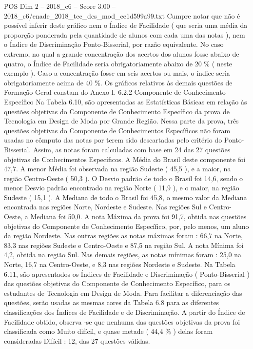 \begin{textsample}{POS Dim 2 – 2018\_c6 – Score 3.00 – 2018\_c6/enade\_2018\_tec\_des\_mod\_ce1d599a99.txt}
Cumpre notar que não é possível inferir deste gráfico nem o Índice de Facilidade ( que seria uma média da proporção ponderada pela quantidade de alunos com cada uma das notas ), nem o Índice de Discriminação Ponto-Bisserial, por razão equivalente.
No caso extremo, no qual a grande concentração dos acertos dos alunos fosse abaixo de quatro, o Índice de Facilidade seria obrigatoriamente abaixo de 20 \% ( neste exemplo ).
Caso a concentração fosse em seis acertos ou mais, o índice seria obrigatoriamente acima de 40 \%.
Os gráficos relativos às demais questões de Formação Geral constam do Anexo I. 6.2.2 Componente de Conhecimento Específico Na Tabela 6.10, são apresentadas as Estatísticas Básicas em relação às questões objetivas do Componente de Conhecimento Específico da prova de Tecnologia em Design de Moda por Grande Região.
Nessa parte da prova, três questões objetivas do Componente de Conhecimentos Específicos não foram usadas no cômputo das notas por terem sido descartadas pelo critério do Ponto-Bisserial.
Assim, as notas foram calculadas com base em 24 das 27 questões objetivas de Conhecimentos Específicos.
A Média do Brasil deste componente foi 47,7.
A menor Média foi observada na região Sudeste ( 45,5 ), e a maior, na região Centro-Oeste ( 50,3 ).
O Desvio padrão de todo o Brasil foi 14,6, sendo o menor Desvio padrão encontrado na região Norte ( 11,9 ), e o maior, na região Sudeste ( 15,1 ).
A Mediana de todo o Brasil foi 45,8, o mesmo valor da Mediana encontrada nas regiões Norte, Nordeste e Sudeste.
Nas regiões Sul e Centro-Oeste, a Mediana foi 50,0.
A nota Máxima da prova foi 91,7, obtida nas questões objetivas do Componente de Conhecimento Específico, por, pelo menos, um aluno da região Nordeste.
Nas outras regiões as notas máximas foram : 66,7 na Norte, 83,3 nas regiões Sudeste e Centro-Oeste e 87,5 na região Sul.
A nota Mínima foi 4,2, obtida na região Sul.
Nas demais regiões, as notas mínimas foram : 25,0 na Norte, 16,7 na Centro-Oeste, e 8,3 nas regiões Nordeste e Sudeste.
Na Tabela 6.11, são apresentados os Índices de Facilidade e Discriminação ( Ponto-Bisserial ) das questões objetivas do Componente de Conhecimento Específico, para os estudantes de Tecnologia em Design de Moda.
Para facilitar a diferenciação das questões, serão usadas as mesmas cores da Tabela 6.8 para as diferentes classificações dos Índices de Facilidade e de Discriminação.
A partir do Índice de Facilidade obtido, observa -se que nenhuma das questões objetivas da prova foi classificada como Muito difícil, e quase metade ( 44,4 \% ) delas foram consideradas Difícil : 12, das 27 questões válidas.

\end{textsample}
